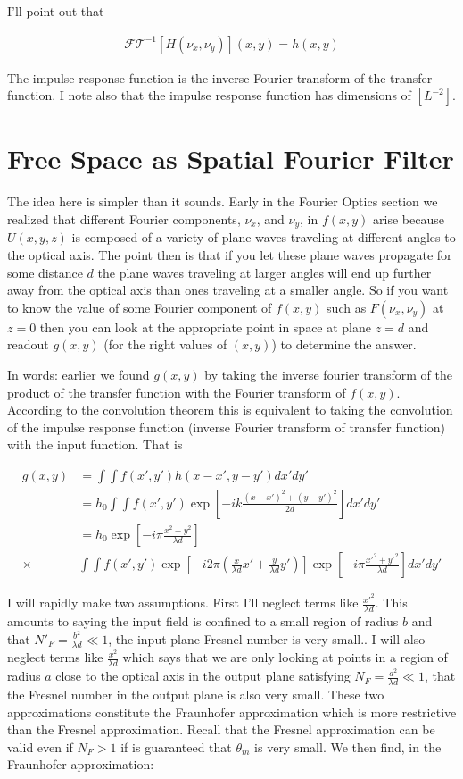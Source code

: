 \documentclass[12pt]{article}
\begin{document}
I'll point out that

\begin{align}
\mathcal{FT}^{-1}[H(\nu_x,\nu_y)](x,y) = h(x,y)
\end{align}

The impulse response function is the inverse Fourier transform of the transfer function. I note also that the impulse response function has dimensions of $[L^{-2}]$.

\section{Free Space as Spatial Fourier Filter}

The idea here is simpler than it sounds. Early in the Fourier Optics section we realized that different Fourier components, $\nu_x$, and $\nu_y$, in $f(x,y)$ arise because $U(x,y,z)$ is composed of a variety of plane waves traveling at different angles to the optical axis. The point then is that if you let these plane waves propagate for some distance $d$ the plane waves traveling at larger angles will end up further away from the optical axis than ones traveling at a smaller angle. So if you want to know the value of some Fourier component of $f(x,y)$ such as $F(\nu_x,\nu_y)$ at $z=0$ then you can look at the appropriate point in space at plane $z=d$ and readout $g(x,y)$ (for the right values of $(x,y)$) to determine the answer.

In words: earlier we found $g(x,y)$ by taking the inverse fourier transform of the product of the transfer function with the Fourier transform of $f(x,y)$. According to the convolution theorem this is equivalent to taking the convolution of the impulse response function (inverse Fourier transform of transfer function) with the input function. That is

\begin{align}
g(x,y) &= \int \int f(x',y') h(x-x',y-y') dx'dy'\\
&= h_0 \int \int f(x',y') \exp\left[-ik \frac{(x-x')^2+(y-y')^2}{2d}\right] dx' dy'\\
&= h_0 \exp\left[-i\pi \frac{x^2+y^2}{\lambda d}\right]\\
\times& \int \int f(x',y') \exp\left[-i2\pi \left(\frac{x}{\lambda d} x' + \frac{y}{\lambda d} y'\right)\right] \exp\left[-i \pi \frac{x'^2+y'^2}{\lambda d} \right] dx' dy'
\end{align}

I will rapidly make two assumptions. First I'll neglect terms like $\frac{x'^2}{\lambda d}$. This amounts to saying the input field is confined to a small region of radius $b$ and that $N'_F = \frac{b^2}{\lambda d} \ll1$, the input plane Fresnel number is very small.. I will also neglect terms like $\frac{x^2}{\lambda d}$ which says that we are only looking at points in a region of radius $a$ close to the optical axis in the output plane satisfying $N_F = \frac{a^2}{\lambda d} \ll1$, that the Fresnel number in the output plane is also very small. These two approximations constitute the Fraunhofer approximation which is more restrictive than the Fresnel approximation. Recall that the Fresnel approximation can be valid even if $N_F>1$ if is guaranteed that $\theta_m$ is very small. We then find, in the Fraunhofer approximation:
\end{document}
